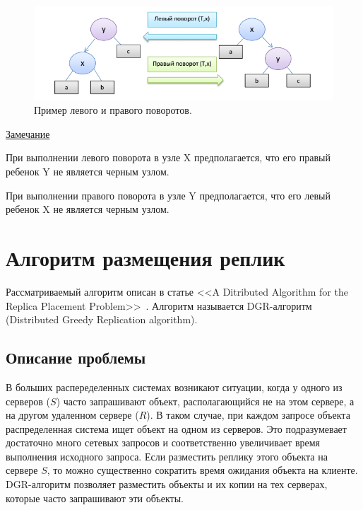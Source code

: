 		\begin{figure}[H]
			\centering
			\includegraphics[width=\textwidth]{img/shift.png}
			\caption{Пример левого и правого поворотов.}
		\end{figure}

		\underline{Замечание}

		При выполнении левого поворота в узле X предполагается, что
		его правый ребенок Y не является черным узлом.
	
		При выполнении правого поворота в узле Y предполагается, что
		его левый ребенок X не является черным узлом.

	\section{Алгоритм размещения реплик}	
		Рассматриваемый алгоритм описан в статье <<A Ditributed Algorithm for the Replica Placement Problem>>~\cite{DGR}.
		Алгоритм называется DGR-алгоритм (Distributed Greedy Replication algorithm).

		\subsection{Описание проблемы}
			В больших распеределенных системах возникают ситуации, когда у одного из серверов ($S$) часто запрашивают объект,
			располагающийся не на этом сервере, а на другом удаленном сервере ($R$). В таком случае, при каждом запросе объекта
			распределенная система ищет объект на одном из серверов. Это подразумевает достаточно много сетевых запросов и 
			соответственно увеличивает время выполнения исходного запроса. Если разместить реплику этого объекта на сервере $S$,
			то можно существенно сократить время ожидания объекта на клиенте. DGR-алгоритм позволяет разместить объекты и их
			копии на тех серверах, которые часто запрашивают эти объекты. 

